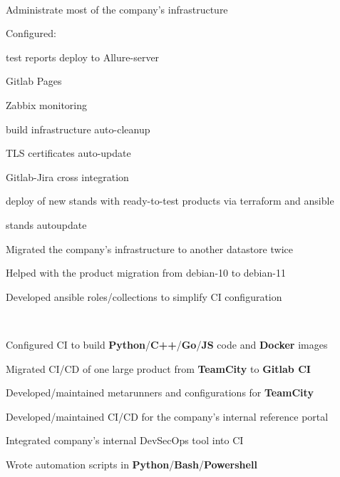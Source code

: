 \documentclass[a4paper]{MagicalCV}
\begin{document}
\begin{minipage}[t]{0.64\textwidth} 


 \\
\vspace{\topsep} %
\begin{tightemize}
  \item Administrate most of the company's infrastructure
  \item Configured:
  \begin{tightemize}
    \item test reports deploy to Allure-server
    \item Gitlab Pages
    \item Zabbix monitoring
    \item build infrastructure auto-cleanup
    \item TLS certificates auto-update
    \item Gitlab-Jira cross integration
    \item deploy of new stands with ready-to-test products via terraform and ansible
    \item stands autoupdate
  \end{tightemize}
  \item Migrated the company's infrastructure to another datastore twice
  \item Helped with the product migration from debian-10 to debian-11
  \item Developed ansible roles/collections to simplify CI configuration
\end{tightemize}
\sectionsep

 \\
\vspace{\topsep} %
\begin{tightemize}
  \item Configured CI to build \textbf{Python}/\textbf{C++}/\textbf{Go}/\textbf{JS} code and \textbf{Docker} images
  \item Migrated CI/CD of one large product from \textbf{TeamCity} to \textbf{Gitlab CI}
  \item Developed/maintained metarunners and configurations for \textbf{TeamCity}
  \item Developed/maintained CI/CD for the company's internal reference portal
  \item Integrated company's internal DevSecOps tool into CI
  \item Wrote automation scripts in \textbf{Python}/\textbf{Bash}/\textbf{Powershell}
\end{tightemize}
\sectionsep

\end{minipage} 
\end{document}
